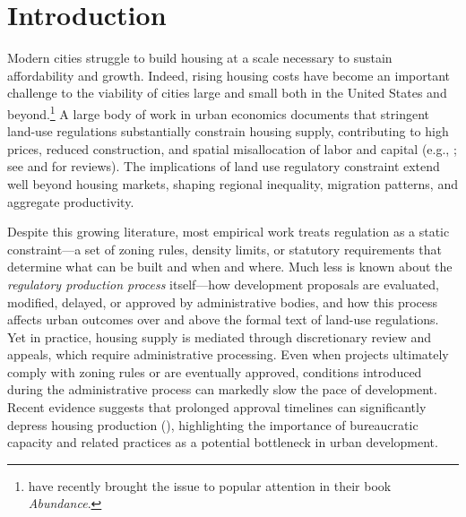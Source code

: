 \section{Introduction}\label{sec_intro}

Modern cities struggle to build housing at a scale necessary to sustain affordability and growth. Indeed, rising housing costs have become an important challenge to the viability of cities large and small both in the United States and beyond.\footnote{\citet{klein2025abundance} have recently brought the issue to popular attention in their book \emph{Abundance}.} A large body of work in urban economics documents that stringent land-use regulations substantially constrain housing supply, contributing to high prices, reduced construction, and spatial misallocation of labor and capital (e.g., \citealp{glaeser2009, turner2014, hilber2016, ganongshoag2017, albouy2018, hsieh2019, brueckner2020, gabriel2020}; see \citealp{gyourkomolloy2015} and \citealp{molloy2020} for reviews). The implications of land use regulatory constraint extend well beyond housing markets, shaping regional inequality, migration patterns, and aggregate productivity.

Despite this growing literature, most empirical work treats regulation as a static constraint---a set of zoning rules, density limits, or statutory requirements that determine what can be built and when and where. Much less is known about the \textit{regulatory production process} itself---how development proposals are evaluated, modified, delayed, or approved by administrative bodies, and how this process affects urban outcomes over and above the formal text of land-use regulations. Yet in practice, housing supply is mediated through discretionary review and appeals, which require administrative processing. Even when projects ultimately comply with zoning rules or are eventually approved, conditions introduced during the administrative process can markedly slow the pace of development. Recent evidence suggests that prolonged approval timelines can significantly depress housing production (\citealp{gabrielkung2025}), highlighting the importance of bureaucratic capacity and related practices as a potential bottleneck in urban development.

